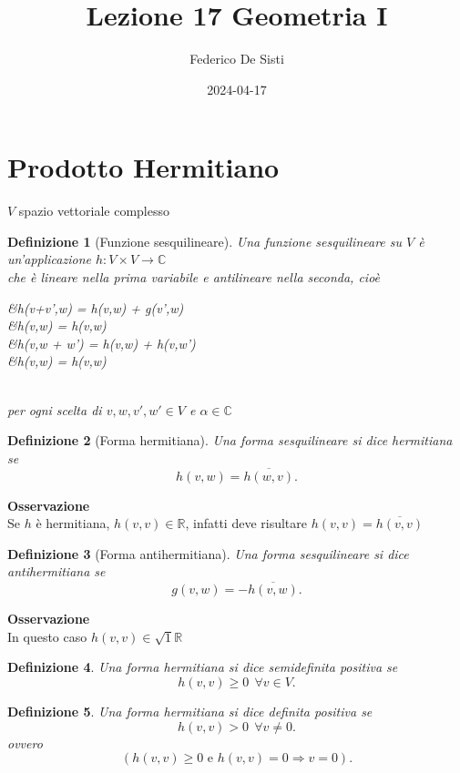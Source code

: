 \documentclass[12px]{article}
\title{Lezione 17 Geometria I}
\date{2024-04-17}
\author{Federico De Sisti}
\theoremstyle{break}
\theoremstyle{break}
\theoremstyle{break}
\newtheorem{defin}{Definizione}
\theoremstyle{break}
\theoremstyle{break}
\theoremstyle{break}
\newenvironment{defi}
{\begin{mdframed}[linecolor=orange, backgroundcolor=orange!10]\begin{defin}}
  {\end{defin}\end{mdframed}}
\newcommand{\R}{\mathbb{R}}
\begin{document}
	\maketitle
	\newpage
	\section{Prodotto Hermitiano}
	$V$ spazio vettoriale complesso
	\begin{defi}[Funzione sesquilineare]
		Una funzione sesquilineare su $V$ è un'applicazione $h: V\times V \rightarrow \mathbb{C}$\\
		che è lineare nella prima variabile e antilineare nella seconda, cioè\\[10px]
		\begin{aligned}
			\hspace{80px}&h(v+v',w) = h(v,w) + g(v',w)\\
		&h(\alpha v,w) = \alpha h(v,w)\\
		&h(v,w + w') = h(v,w) + h(v,w')\\
			&h(v,\alpha w) = \overline{\alpha}h(v,w)\\
		\end{aligned}\\[10px]
		per ogni scelta di $v,w,v',w'\in V$ e $\alpha \in\mathbb{C}$
	\end{defi}
	\begin{defi}[Forma hermitiana]
		Una forma sesquilineare si dice hermitiana se
		\[
			h(v,w) = \overline{h(w,v)}
		.\] 
	\end{defi}
	\textbf{Osservazione}\\
	Se $h$ è hermitiana, $h(v,v)\in\R$, infatti deve risultare $h(v,v) = \overline{h(v,v)}$
	\begin{defi}[Forma antihermitiana]
		Una forma sesquilineare si dice antihermitiana se 
		\[
			g(v,w) = - \overline{h(v,w)}
		.\] 
	\end{defi}
	\textbf{Osservazione}\\
	In questo caso $h(v,v)\in\sqrt{1}\R$\\
	\begin{defi}
		Una forma hermitiana si dice semidefinita positiva se 
		\[
		h(v,v) \geq 0 \ \ \forall v\in V
		.\] 
	\end{defi}
	\begin{defi}
		Una forma hermitiana si dice definita positiva se 
		\[
		h(v,v)>0 \ \ \forall v \neq 0
		.\] 
		ovvero
		\[
			(h(v,v)\geq 0 \text{ e }h(v,v) = 0 \Rightarrow v=0)
		.\] 
	\end{defi}
\end{document}
